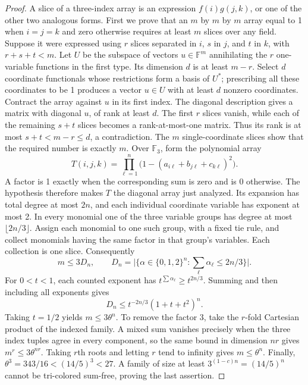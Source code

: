 \documentclass[11pt]{article}
\begin{document}
\begin{proof}
A slice of a three-index array is an expression $f(i)g(j,k)$, or one of the other two analogous forms. First we prove that an $m$ by $m$ by $m$ array equal to 1 when $i=j=k$ and zero otherwise requires at least $m$ slices over any field. Suppose it were expressed using $r$ slices separated in $i$, $s$ in $j$, and $t$ in $k$, with $r+s+t<m$. Let $U$ be the subspace of vectors $u\in\mathbb F^m$ annihilating the $r$ one-variable functions in the first type. Its dimension $d$ is at least $m-r$. Select $d$ coordinate functionals whose restrictions form a basis of $U^*$; prescribing all these coordinates to be 1 produces a vector $u\in U$ with at least $d$ nonzero coordinates. Contract the array against $u$ in its first index. The diagonal description gives a matrix with diagonal $u$, of rank at least $d$. The first $r$ slices vanish, while each of the remaining $s+t$ slices becomes a rank-at-most-one matrix. Thus its rank is at most $s+t<m-r\le d$, a contradiction. The $m$ single-coordinate slices show that the required number is exactly $m$.
Over $\mathbb F_3$, form the polynomial array
\[
T(i,j,k)=\prod_{\ell=1}^n\bigl(1-(a_{i\ell}+b_{j\ell}+c_{k\ell})^2\bigr).
\]
A factor is 1 exactly when the corresponding sum is zero and is 0 otherwise. The hypothesis therefore makes $T$ the diagonal array just analyzed. Its expansion has total degree at most $2n$, and each individual coordinate variable has exponent at most 2. In every monomial one of the three variable groups has degree at most $\lfloor2n/3\rfloor$. Assign each monomial to one such group, with a fixed tie rule, and collect monomials having the same factor in that group's variables. Each collection is one slice. Consequently
\[
m\le3D_n,\qquad D_n=\bigl|\{\alpha\in\{0,1,2\}^n:\sum_\ell\alpha_\ell\le2n/3\}\bigr|.
\]
For $0<t<1$, each counted exponent has $t^{\sum\alpha_\ell}\ge t^{2n/3}$. Summing and then including all exponents gives
\[
D_n\le t^{-2n/3}(1+t+t^2)^n.
\]
Taking $t=1/2$ yields $m\le3\theta^n$. To remove the factor 3, take the $r$-fold Cartesian product of the indexed family. A mixed sum vanishes precisely when the three index tuples agree in every component, so the same bound in dimension $nr$ gives $m^r\le3\theta^{nr}$. Taking $r$th roots and letting $r$ tend to infinity gives $m\le\theta^n$. Finally, $\theta^3=343/16<(14/5)^3<27$. A family of size at least $3^{(1-c)n}=(14/5)^n$ cannot be tri-colored sum-free, proving the last assertion.
\end{proof}
\end{document}
